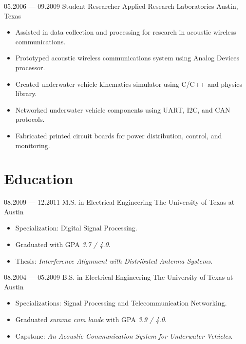 \documentclass[11pt,a4paper,sans]{moderncv}
\begin{document}
\cventry%
    {05.2006 --- 09.2009}%
    {Student Researcher}%
    {Applied Research Laboratories}%
    {Austin, Texas}%
    {}%
    {%
    \begin{itemize}
        \item Assisted in data collection and processing for research in acoustic wireless communications.
        \item Prototyped acoustic wireless communications system using Analog Devices processor.
        \item Created underwater vehicle kinematics simulator using C/C++ and physics library.
        \item Networked underwater vehicle components using UART, I2C, and CAN protocols.
        \item Fabricated printed circuit boards for power distribution, control, and monitoring.
    \end{itemize}%
    }

\section{Education}

\cventry%
    {08.2009 --- 12.2011}%
    {M.S. in Electrical Engineering}%
    {The University of Texas at Austin}%
    {}%
    {}%
    {%
    \begin{itemize}
        \item Specialization: Digital Signal Processing.
        \item Graduated with GPA \textit{3.7 / 4.0}.
        \item Thesis: \textit{Interference Alignment with Distributed Antenna Systems}.
    \end{itemize}%
    }

\cventry%
    {08.2004 --- 05.2009}%
    {B.S. in Electrical Engineering}%
    {The University of Texas at Austin}%
    {}%
    {}%
    {%
    \begin{itemize}
        \item Specializations: Signal Processing and Telecommunication Networking.
        \item Graduated \textit{summa cum laude} with GPA \textit{3.9 / 4.0}.
        \item Capstone: \textit{An Acoustic Communication System for Underwater Vehicles}.
    \end{itemize}%
    }

%
\end{document}
